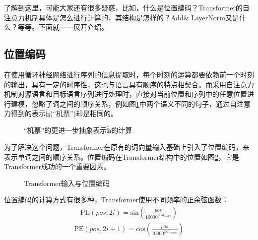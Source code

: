 \parinterval 了解到这里，可能大家还有很多疑惑，比如，什么是位置编码？Transformer的自注意力机制具体是怎么进行计算的，其结构是怎样的？Add\& LayerNorm又是什么？等等。下面就一一展开介绍。


\subsection{位置编码}

\parinterval 在使用循环神经网络进行序列的信息提取时，每个时刻的运算都要依赖前一个时刻的输出，具有一定的时序性，这也与语言具有顺序的特点相契合。而采用自注意力机制对源语言和目标语言序列进行处理时，直接对当前位置和序列中的任意位置进行建模，忽略了词之间的顺序关系，例如图\ref{fig:6-41}中两个语义不同的句子，通过自注意力得到的表示$\tilde{\mathbf{h}}$(``机票'')却是相同的。

\begin{figure}[htp]
\centering

\caption{``机票''的更进一步抽象表示$\tilde{\mathbf{h}}$的计算}
\label{fig:6-41}
\end{figure}

\parinterval 为了解决这个问题，Transformer在原有的词向量输入基础上引入了位置编码，来表示单词之间的顺序关系。位置编码在Transformer结构中的位置如图\ref{fig:6-42}，它是Transformer成功的一个重要因素。

\begin{figure}[htp]
\centering

\caption{Transformer输入与位置编码}
\label{fig:6-42}
\end{figure}

\parinterval 位置编码的计算方式有很多种，Transformer使用不同频率的正余弦函数：
\begin{eqnarray}
\textrm{PE}(pos,2i) = \textrm{sin} (\frac{pos}{10000^{2i/d_{model}}})
\label{eq:6-43}
\end{eqnarray}
\begin{eqnarray}
\textrm{PE}(pos,2i+1) = \textrm{cos} (\frac{pos}{10000^{2i/d_{model}}})
\label{eq:6-44}
\end{eqnarray}

